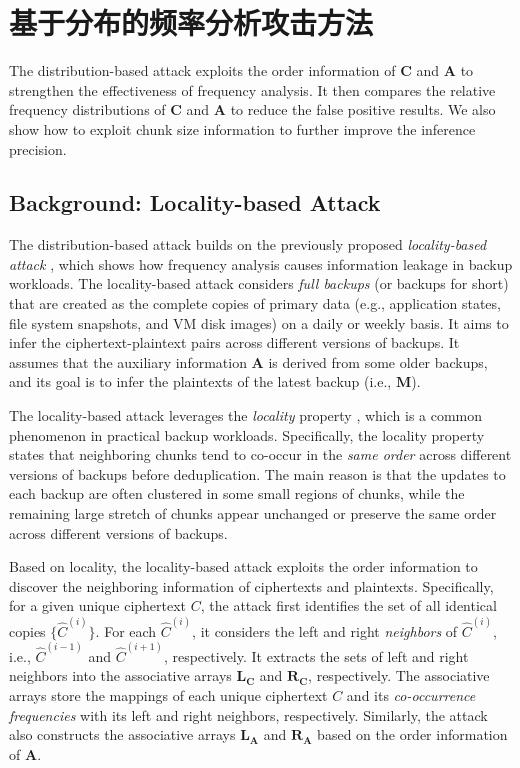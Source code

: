 \chapter{基于分布的频率分析攻击方法}
\label{sec:DistributionAttack}

The distribution-based attack exploits the order information of $\mathbf{C}$
and $\mathbf{A}$ to strengthen the effectiveness of frequency analysis.  It
then compares the relative frequency distributions of $\mathbf{C}$ and
$\mathbf{A}$ to reduce the false positive results.  We also show how to
exploit chunk size information to further improve the inference precision.  

\section{Background: Locality-based Attack}
\label{sec:prior-attack}

The distribution-based attack builds on the previously proposed {\em
locality-based attack} \cite{li17}, which shows how frequency analysis causes
information leakage in backup workloads.  The locality-based attack considers
{\em full backups} (or backups for short) that are created as the complete
copies of primary data (e.g., application states, file system snapshots, and
VM disk images) on a daily or weekly basis. It aims to infer the
ciphertext-plaintext pairs across different versions of backups.  It assumes
that the auxiliary information $\mathbf{A}$ is derived from some older
backups, and its goal is to infer the plaintexts of the latest backup (i.e.,
$\mathbf{M}$). 

The locality-based attack leverages the {\em locality} property
\cite{xia11,zhu08,lillibridge09}, which is a common phenomenon in practical
backup workloads. Specifically, the locality property states that neighboring
chunks tend to co-occur in the {\em same order} across different versions of
backups before deduplication. The main reason is that the updates to each
backup are often clustered in some small regions of chunks, while the
remaining large stretch of chunks appear unchanged or preserve the same order
across different versions of backups.  

Based on locality, the locality-based attack exploits the order information to
discover the neighboring information of ciphertexts and plaintexts.
Specifically, for a given unique ciphertext $C$, the attack first identifies
the set of all identical copies $\{\hat{C}^{(i)}\}$.  For each
$\hat{C}^{(i)}$, it considers the left and right {\em neighbors} of
$\hat{C}^{(i)}$, i.e., $\hat{C}^{(i-1)}$ and $\hat{C}^{(i+1)}$, respectively.
It extracts the sets of left and right neighbors into the associative arrays
$\mathbf{L_C}$ and $\mathbf{R_C}$, respectively.  The associative arrays store
the mappings of each unique ciphertext $C$ and its {\em co-occurrence
frequencies} with its left and right neighbors, respectively.   Similarly, the attack also constructs the
associative arrays $\mathbf{L_A}$ and $\mathbf{R_A}$ based on the order
information of $\mathbf{A}$. 

